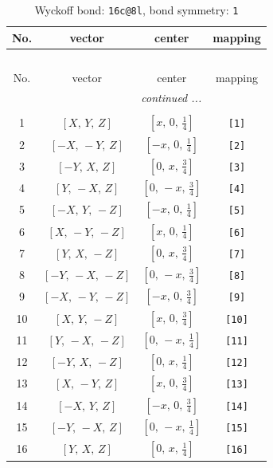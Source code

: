 \documentclass[fleqn,8pt]{jsarticle}
\begin{document}
\begin{longtable}{cccc}
\caption{Wyckoff bond: {\tt 16c@8l}, bond symmetry: {\tt 1}}
 \\
 \hline \hline
No. & vector & center & mapping \\ \hline \endfirsthead

\multicolumn{3}{l}{\tablename\ \thetable{}} \\
 \hline \hline
No. & vector & center & mapping \\ \hline \endhead

 \hline \hline
\multicolumn{3}{r}{\footnotesize\it continued ...} \\ \endfoot

 \hline \hline
\multicolumn{3}{r}{} \\ \endlastfoot

1 & $\left[ X,\, Y,\, Z \right]$ & $\left[ x,\, 0,\, \frac{1}{4} \right]$ & {\tt [1]} \\ \hline
2 & $\left[ - X,\, - Y,\, Z \right]$ & $\left[ - x,\, 0,\, \frac{1}{4} \right]$ & {\tt [2]} \\ \hline
3 & $\left[ - Y,\, X,\, Z \right]$ & $\left[ 0,\, x,\, \frac{3}{4} \right]$ & {\tt [3]} \\ \hline
4 & $\left[ Y,\, - X,\, Z \right]$ & $\left[ 0,\, - x,\, \frac{3}{4} \right]$ & {\tt [4]} \\ \hline
5 & $\left[ - X,\, Y,\, - Z \right]$ & $\left[ - x,\, 0,\, \frac{1}{4} \right]$ & {\tt [5]} \\ \hline
6 & $\left[ X,\, - Y,\, - Z \right]$ & $\left[ x,\, 0,\, \frac{1}{4} \right]$ & {\tt [6]} \\ \hline
7 & $\left[ Y,\, X,\, - Z \right]$ & $\left[ 0,\, x,\, \frac{3}{4} \right]$ & {\tt [7]} \\ \hline
8 & $\left[ - Y,\, - X,\, - Z \right]$ & $\left[ 0,\, - x,\, \frac{3}{4} \right]$ & {\tt [8]} \\ \hline
9 & $\left[ - X,\, - Y,\, - Z \right]$ & $\left[ - x,\, 0,\, \frac{3}{4} \right]$ & {\tt [9]} \\ \hline
10 & $\left[ X,\, Y,\, - Z \right]$ & $\left[ x,\, 0,\, \frac{3}{4} \right]$ & {\tt [10]} \\ \hline
11 & $\left[ Y,\, - X,\, - Z \right]$ & $\left[ 0,\, - x,\, \frac{1}{4} \right]$ & {\tt [11]} \\ \hline
12 & $\left[ - Y,\, X,\, - Z \right]$ & $\left[ 0,\, x,\, \frac{1}{4} \right]$ & {\tt [12]} \\ \hline
13 & $\left[ X,\, - Y,\, Z \right]$ & $\left[ x,\, 0,\, \frac{3}{4} \right]$ & {\tt [13]} \\ \hline
14 & $\left[ - X,\, Y,\, Z \right]$ & $\left[ - x,\, 0,\, \frac{3}{4} \right]$ & {\tt [14]} \\ \hline
15 & $\left[ - Y,\, - X,\, Z \right]$ & $\left[ 0,\, - x,\, \frac{1}{4} \right]$ & {\tt [15]} \\ \hline
16 & $\left[ Y,\, X,\, Z \right]$ & $\left[ 0,\, x,\, \frac{1}{4} \right]$ & {\tt [16]} \\
\end{longtable}
\end{document}
